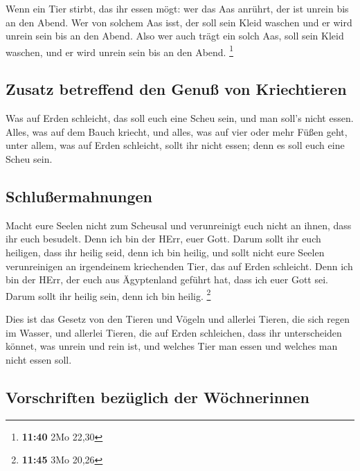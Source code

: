  Wenn ein Tier stirbt, das ihr essen mögt: wer das Aas
anrührt, der ist unrein bis an den Abend.  Wer von
solchem Aas isst, der soll sein Kleid waschen und er wird unrein sein
bis an den Abend. Also wer auch trägt ein solch Aas, soll sein Kleid
waschen, und er wird unrein sein bis an den Abend. \footnote{\textbf{11:40}
  2Mo 22,30}

\hypertarget{zusatz-betreffend-den-genuuxdf-von-kriechtieren}{%
\subsection{Zusatz betreffend den Genuß von
Kriechtieren}\label{zusatz-betreffend-den-genuuxdf-von-kriechtieren}}

 Was auf Erden schleicht, das soll euch eine Scheu sein,
und man soll's nicht essen.  Alles, was auf dem Bauch
kriecht, und alles, was auf vier oder mehr Füßen geht, unter allem, was
auf Erden schleicht, sollt ihr nicht essen; denn es soll euch eine Scheu
sein.

\hypertarget{schluuxdfermahnungen}{%
\subsection{Schlußermahnungen}\label{schluuxdfermahnungen}}

 Macht eure Seelen nicht zum Scheusal und verunreinigt
euch nicht an ihnen, dass ihr euch besudelt.  Denn ich
bin der HErr, euer Gott. Darum sollt ihr euch heiligen, dass ihr heilig
seid, denn ich bin heilig, und sollt nicht eure Seelen verunreinigen an
irgendeinem kriechenden Tier, das auf Erden schleicht. 
Denn ich bin der HErr, der euch aus Ägyptenland geführt hat, dass ich
euer Gott sei. Darum sollt ihr heilig sein, denn ich bin heilig.
\footnote{\textbf{11:45} 3Mo 20,26}

 Dies ist das Gesetz von den Tieren und Vögeln und
allerlei Tieren, die sich regen im Wasser, und allerlei Tieren, die auf
Erden schleichen,  dass ihr unterscheiden könnet, was
unrein und rein ist, und welches Tier man essen und welches man nicht
essen soll.

\hypertarget{vorschriften-bezuxfcglich-der-wuxf6chnerinnen}{%
\subsection{Vorschriften bezüglich der
Wöchnerinnen}\label{vorschriften-bezuxfcglich-der-wuxf6chnerinnen}}

